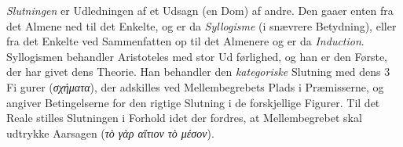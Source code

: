 \documentclass[12pt,a4paper]{book}
\newcommand{\gk}[1]{\textit{#1}}
\begin{document}
\emph{Slutningen} er Udledningen af et Udsagn (en Dom) af
andre. Den gaaer enten fra det Almene ned til det Enkelte,
og er da \emph{Syllogisme} (i snævrere Betydning), eller fra
det Enkelte ved Sammenfatten op til det Almenere og er da
\emph{Induction}. Syllogismen behandler Aristoteles med stor Ud\-%
førlighed, og han er den Første, der har givet dens Theorie.
Han behandler den \emph{kategoriske} Slutning med dens 3 Fi\-%
gurer (\gk{σχήματα}), der adskilles ved Mellembegrebets Plads i
Præmisserne, og angiver Betingelserne for den rigtige Slutning
i de forskjellige Figurer. Til det Reale stilles Slutningen i
Forhold idet der fordres, at Mellembegrebet skal udtrykke
Aarsagen (\gk{τὸ γὰρ αἴτιον τὸ μέσον}).
\end{document}
